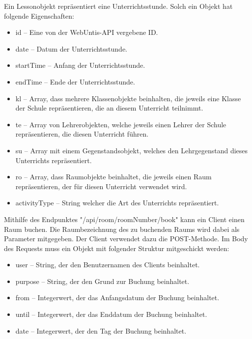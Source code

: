 
Ein Lessonobjekt repräsentiert eine Unterrichtsstunde. Solch ein Objekt hat folgende Eigenschaften: 

\begin{itemize}
    \item id -- Eine von der WebUntis-API vergebene ID.
    \item date -- Datum der Unterrichtsstunde.
    \item startTime -- Anfang der Unterrichtsstunde.
    \item endTime -- Ende der Unterrichtsstunde.
    \item kl -- Array, dass mehrere Klassenobjekte beinhalten, die jeweils eine Klasse der Schule repräsentieren, die an diesem Unterricht teilnimmt. 
    \item te -- Array von Lehrerobjekten, welche jeweils einen Lehrer der Schule repräsentieren, die diesen Unterricht führen. 
    \item su -- Array mit einem Gegenstandsobjekt, welches den Lehrgegenstand dieses Unterrichts repräsentiert.
    \item ro -- Array, dass Raumobjekte beinhaltet, die jeweils einen Raum repräsentieren, der für diesen Unterricht verwendet wird. 
    \item activityType -- String welcher die Art des Unterrichts repräsentiert. 
\end{itemize}


Mithilfe des Endpunktes "/api/room/{roomNumber}/book" kann ein Client einen Raum buchen. Die Raumbezeichnung des zu buchenden Raums wird dabei als Parameter mitgegeben. Der Client verwendet dazu die POST-Methode. Im Body des Requests muss ein Objekt mit folgender Struktur mitgeschickt werden: 

\begin{itemize}
    \item user -- String, der den Benutzernamen des Clients beinhaltet. 
    \item purpose -- String, der den Grund zur Buchung beinhaltet.
    \item from -- Integerwert, der das Anfangsdatum der Buchung beinhaltet.
    \item until -- Integerwert, der das Enddatum der Buchung beinhaltet.
    \item date -- Integerwert, der den Tag der Buchung beinhaltet. 
\end{itemize}

